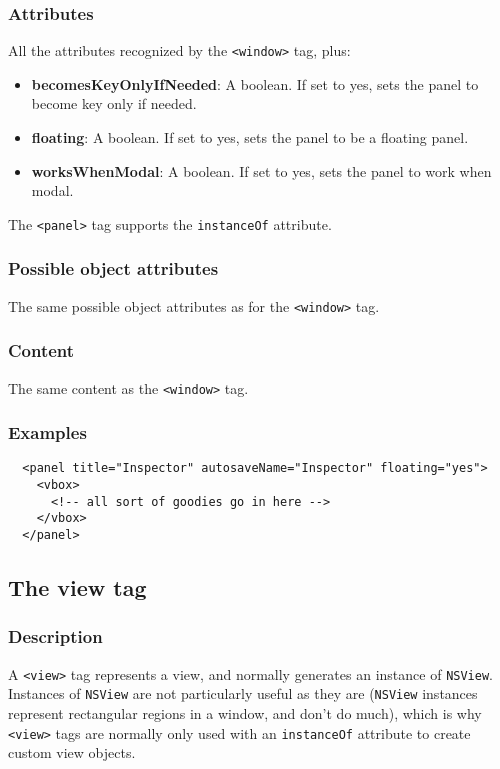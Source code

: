 \subsubsection{Attributes}
All the attributes recognized by the \texttt{<window>} tag, plus:
\begin{itemize}
\item {\bf becomesKeyOnlyIfNeeded}: A boolean.  If set to yes, sets
  the panel to become key only if needed.
\item {\bf floating}: A boolean.  If set to yes, sets the panel to be
  a floating panel.
\item {\bf worksWhenModal}: A boolean.  If set to yes, sets the panel
  to work when modal.
\end{itemize}

The \texttt{<panel>} tag supports the \texttt{instanceOf} attribute.

\subsubsection{Possible object attributes}
The same possible object attributes as for the \texttt{<window>} tag.

\subsubsection{Content}
The same content as the \texttt{<window>} tag.

\subsubsection{Examples}
\begin{verbatim}
  <panel title="Inspector" autosaveName="Inspector" floating="yes">
    <vbox>
      <!-- all sort of goodies go in here -->
    </vbox>
  </panel>
\end{verbatim}

\subsection{The view tag}

\subsubsection{Description}
A \texttt{<view>} tag represents a view, and normally generates an
instance of \texttt{NSView}.  Instances of \texttt{NSView} are not
particularly useful as they are (\texttt{NSView} instances represent
rectangular regions in a window, and don't do much), which is why
\texttt{<view>} tags are normally only used with an \texttt{instanceOf}
 attribute to create custom view objects.

